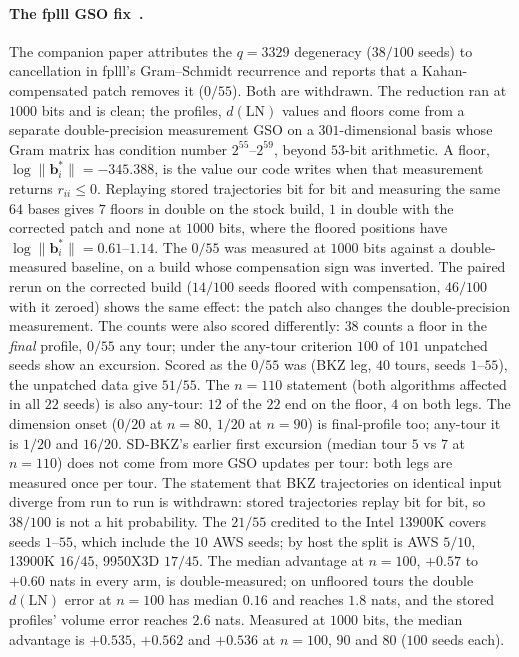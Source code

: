 \documentclass[journal=cic,version=preprint]{iacrj}
\begin{document}
\paragraph{The fplll GSO fix~\cite[\S8]{Paper1}.} The companion paper
attributes the $q=3329$ degeneracy ($38/100$ seeds) to cancellation in
fplll's Gram--Schmidt recurrence and reports that a Kahan-compensated patch
removes it ($0/55$). Both are withdrawn. The reduction ran at $1000$ bits and
is clean; the profiles, $d(\mathrm{LN})$ values and floors come from a
separate double-precision measurement GSO on a $301$-dimensional basis whose
Gram matrix has condition number $2^{55}$--$2^{59}$, beyond $53$-bit
arithmetic. A floor, $\log\|\mathbf b_i^\ast\|=-345.388$, is the value our
code writes when that measurement returns $r_{ii}\le0$. Replaying stored
trajectories bit for bit and measuring the same $64$ bases gives $7$ floors
in double on the stock build, $1$ in double with the corrected patch and none at
$1000$ bits, where the floored positions have
$\log\|\mathbf b_i^\ast\|=0.61$--$1.14$. The $0/55$ was measured at $1000$
bits against a double-measured baseline, on a build whose compensation sign
was inverted. The paired rerun on the corrected build ($14/100$ seeds floored
with compensation, $46/100$ with it zeroed) shows the same effect: the patch
also changes the double-precision measurement.
The counts were also scored differently: $38$ counts a floor in the
\emph{final} profile, $0/55$ any tour; under the any-tour criterion $100$ of
$101$ unpatched seeds show an excursion. Scored as the $0/55$ was (BKZ leg,
$40$ tours, seeds $1$--$55$), the unpatched data give $51/55$.
The $n=110$ statement (both algorithms affected in all $22$ seeds) is
also any-tour: $12$ of the $22$ end on the floor, $4$ on both legs.
The dimension onset ($0/20$ at $n=80$, $1/20$ at $n=90$) is final-profile
too; any-tour it is $1/20$ and $16/20$. SD-BKZ's earlier first excursion
(median tour $5$ vs $7$ at $n=110$) does not come from more GSO updates per
tour: both legs are measured once per tour. The statement that BKZ
trajectories on identical input diverge from run to run is withdrawn: stored
trajectories replay bit for bit, so $38/100$ is not a hit probability. The
$21/55$ credited to the Intel 13900K covers seeds $1$--$55$, which include the
$10$ AWS seeds; by host the split is AWS $5/10$, 13900K $16/45$, 9950X3D
$17/45$.
The median advantage at $n=100$, $+0.57$ to $+0.60$ nats in every arm, is
double-measured; on unfloored tours the double $d(\mathrm{LN})$
error at $n=100$ has median $0.16$ and reaches $1.8$ nats, and the stored
profiles' volume error reaches $2.6$ nats. Measured at $1000$ bits, the
median advantage is $+0.535$, $+0.562$ and $+0.536$ at $n=100$, $90$ and
$80$ ($100$ seeds each).
\end{document}

